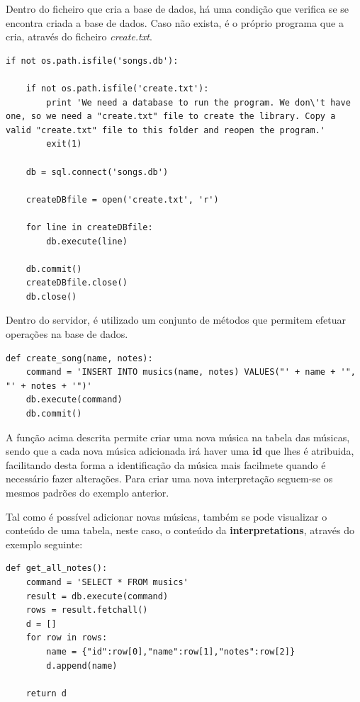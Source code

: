 Dentro do ficheiro que cria a base de dados, há uma condição que verifica se se encontra criada a base de dados. Caso não exista, é o próprio programa que a cria, através do ficheiro \emph{create.txt}.

\begin{lstlisting}
if not os.path.isfile('songs.db'):
	
	if not os.path.isfile('create.txt'):
		print 'We need a database to run the program. We don\'t have one, so we need a "create.txt" file to create the library. Copy a valid "create.txt" file to this folder and reopen the program.'
		exit(1)
		
	db = sql.connect('songs.db')
	
	createDBfile = open('create.txt', 'r')
	
	for line in createDBfile:
		db.execute(line)	
	
	db.commit()
	createDBfile.close()
	db.close()
\end{lstlisting}

Dentro do servidor, é utilizado um conjunto de métodos que permitem efetuar operações na base de dados.

\vspace{5mm}
\begin{lstlisting}
def create_song(name, notes):
	command = 'INSERT INTO musics(name, notes) VALUES("' + name + '", "' + notes + '")'
	db.execute(command)
	db.commit()
\end{lstlisting}
\vspace{5mm}

A função acima descrita permite criar uma nova música na tabela das músicas, sendo que a cada nova música adicionada irá haver uma \textbf{id} que lhes é atribuida, facilitando desta forma a identificação da música mais facilmete quando é necessário fazer alterações. Para criar uma nova interpretação seguem-se os mesmos padrões do exemplo anterior.

Tal como é possível adicionar novas músicas, também se pode visualizar o conteúdo de uma tabela, neste caso, o conteúdo da \textbf{interpretations}, através do exemplo seguinte:

\begin{lstlisting}
def get_all_notes():
	command = 'SELECT * FROM musics'
	result = db.execute(command)
	rows = result.fetchall()
	d = []
	for row in rows:
		name = {"id":row[0],"name":row[1],"notes":row[2]}
		d.append(name)

	return d
\end{lstlisting}

